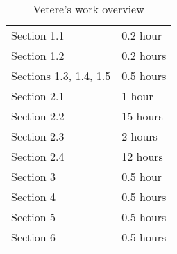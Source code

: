 \begin{table} [H]
\centering
{}
{\centering
\begin{tabular}{m{2.5in}|m{.9in}}
Section 1.1 & 0.2 hour\\
Section 1.2 & 0.2 hours\\
Sections 1.3, 1.4, 1.5 & 0.5 hours\\
Section 2.1 & 1 hour\\
Section 2.2 & 15 hours\\
Section 2.3 & 2 hours\\
Section 2.4 & 12 hours\\
Section 3 & 0.5 hour\\
Section 4 & 0.5 hours\\
Section 5 & 0.5 hours\\
Section 6 & 0.5 hours\\
\end{tabular}
}
\caption{Vetere's work overview}
\end{table}

